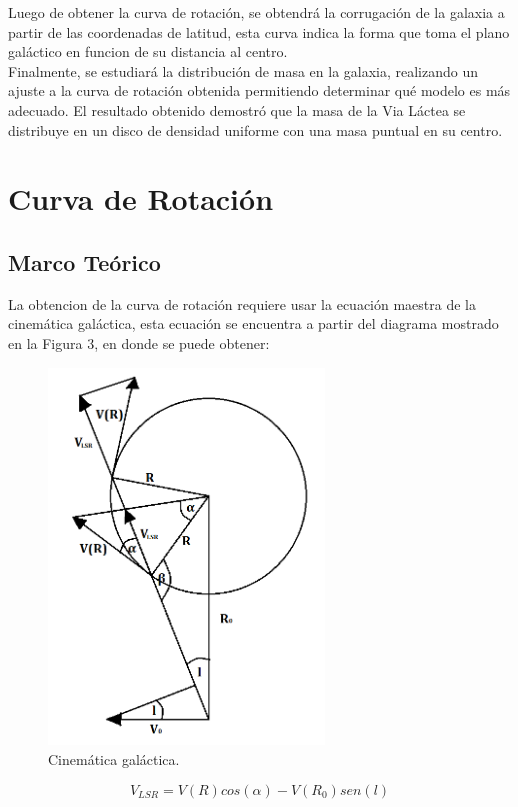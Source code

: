 \documentclass[letterpaper,oneside]{article}
\begin{document}
Luego de obtener la curva de rotación, se obtendrá la corrugación de la galaxia a partir de las coordenadas de latitud, esta curva indica la forma que toma el plano galáctico en funcion de su distancia al centro.\\

Finalmente, se estudiará la distribución de masa en la galaxia, realizando un ajuste a la curva de rotación obtenida permitiendo determinar qué modelo es más adecuado. El resultado obtenido demostró que la masa de la Via Láctea se distribuye en un disco de densidad uniforme con una masa puntual en su centro.\\

\section{Curva de Rotación}
\subsection{Marco Teórico}
La obtencion de la curva de rotación requiere usar la ecuación maestra de la cinemática galáctica, esta ecuación se encuentra a partir del diagrama mostrado en la Figura 3, en donde se puede obtener:

\begin{figure}
  \centering
  \includegraphics[height=10cm]{../graficos/imagenes/ecuacion_maestra.png}
  \caption{Cinemática galáctica.}
\end{figure}

\begin{equation}
     V_{LSR} = V(R)cos(\alpha) - V(R_0)sen(l) 
\end{equation}
\end{document}
